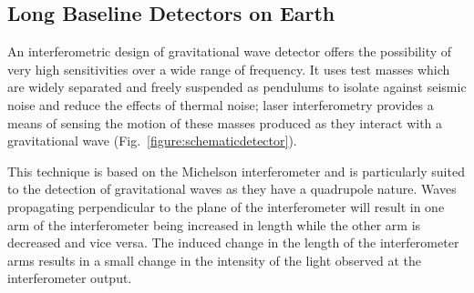 \documentclass{article}
\begin{document}
\subsection{Long Baseline Detectors on Earth}
\label{subsection:earth}

An interferometric design of gravitational wave detector offers the
possibility of very high sensitivities over a wide range of
frequency. It uses test masses which are widely separated and freely
suspended as pendulums to isolate against seismic noise and reduce the
effects of thermal noise; laser interferometry provides a means of
sensing the motion of these masses produced as they interact with a
gravitational wave (Fig.~\ref{figure:schematicdetector}).


This technique is based on the Michelson interferometer and is
particularly suited to the detection of gravitational waves as they
have a quadrupole nature. Waves propagating perpendicular to the plane
of the interferometer will result in one arm of the interferometer
being increased in length while the other arm is decreased and vice
versa. The induced change in the length of the interferometer arms results in
a small change in the intensity of the light observed at the
interferometer output.
\end{document}
